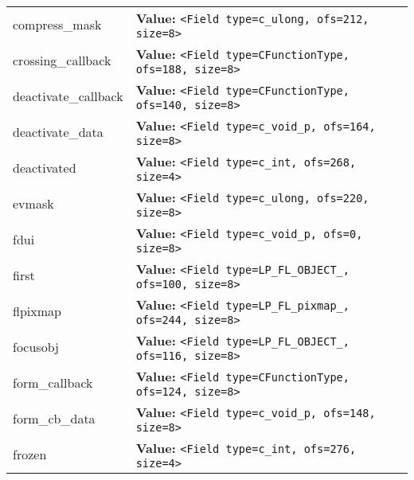 \begin{longtable}{|p{\varnamewidth}|p{\vardescrwidth}|l}
\cline{1-2}
\raggedright c\-o\-m\-p\-r\-e\-s\-s\-\_\-m\-a\-s\-k\- & \raggedright \textbf{Value:} 
{\tt {\textless}Field type=c\_ulong, ofs=212, size=8{\textgreater}}&\\
\cline{1-2}
\raggedright c\-r\-o\-s\-s\-i\-n\-g\-\_\-c\-a\-l\-l\-b\-a\-c\-k\- & \raggedright \textbf{Value:} 
{\tt {\textless}Field type=CFunctionType, ofs=188, size=8{\textgreater}}&\\
\cline{1-2}
\raggedright d\-e\-a\-c\-t\-i\-v\-a\-t\-e\-\_\-c\-a\-l\-l\-b\-a\-c\-k\- & \raggedright \textbf{Value:} 
{\tt {\textless}Field type=CFunctionType, ofs=140, size=8{\textgreater}}&\\
\cline{1-2}
\raggedright d\-e\-a\-c\-t\-i\-v\-a\-t\-e\-\_\-d\-a\-t\-a\- & \raggedright \textbf{Value:} 
{\tt {\textless}Field type=c\_void\_p, ofs=164, size=8{\textgreater}}&\\
\cline{1-2}
\raggedright d\-e\-a\-c\-t\-i\-v\-a\-t\-e\-d\- & \raggedright \textbf{Value:} 
{\tt {\textless}Field type=c\_int, ofs=268, size=4{\textgreater}}&\\
\cline{1-2}
\raggedright e\-v\-m\-a\-s\-k\- & \raggedright \textbf{Value:} 
{\tt {\textless}Field type=c\_ulong, ofs=220, size=8{\textgreater}}&\\
\cline{1-2}
\raggedright f\-d\-u\-i\- & \raggedright \textbf{Value:} 
{\tt {\textless}Field type=c\_void\_p, ofs=0, size=8{\textgreater}}&\\
\cline{1-2}
\raggedright f\-i\-r\-s\-t\- & \raggedright \textbf{Value:} 
{\tt {\textless}Field type=LP\_FL\_OBJECT\_, ofs=100, size=8{\textgreater}}&\\
\cline{1-2}
\raggedright f\-l\-p\-i\-x\-m\-a\-p\- & \raggedright \textbf{Value:} 
{\tt {\textless}Field type=LP\_FL\_pixmap\_, ofs=244, size=8{\textgreater}}&\\
\cline{1-2}
\raggedright f\-o\-c\-u\-s\-o\-b\-j\- & \raggedright \textbf{Value:} 
{\tt {\textless}Field type=LP\_FL\_OBJECT\_, ofs=116, size=8{\textgreater}}&\\
\cline{1-2}
\raggedright f\-o\-r\-m\-\_\-c\-a\-l\-l\-b\-a\-c\-k\- & \raggedright \textbf{Value:} 
{\tt {\textless}Field type=CFunctionType, ofs=124, size=8{\textgreater}}&\\
\cline{1-2}
\raggedright f\-o\-r\-m\-\_\-c\-b\-\_\-d\-a\-t\-a\- & \raggedright \textbf{Value:} 
{\tt {\textless}Field type=c\_void\_p, ofs=148, size=8{\textgreater}}&\\
\cline{1-2}
\raggedright f\-r\-o\-z\-e\-n\- & \raggedright \textbf{Value:} 
{\tt {\textless}Field type=c\_int, ofs=276, size=4{\textgreater}}&\\

\end{longtable}
